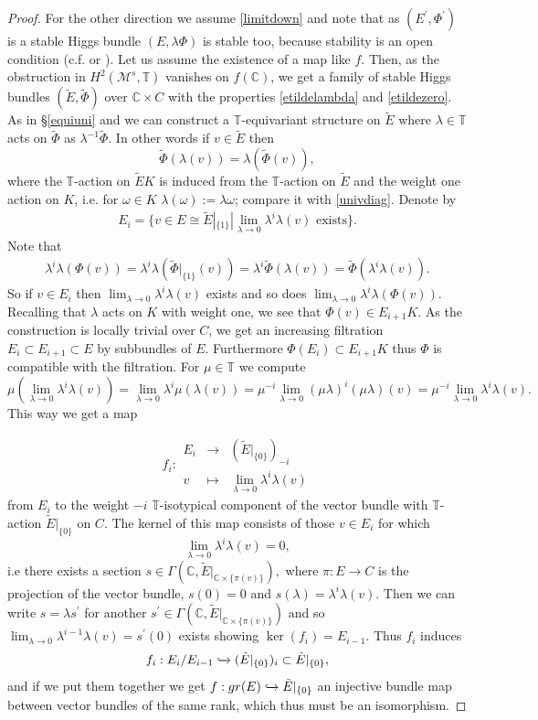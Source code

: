 \documentclass[12pt]{article}
\numberwithin{equation}{section}
\theoremstyle{remark}
\theoremstyle{definition}
\numberwithin{theorem}{section}
\def\beq{\begin{eqnarray}}
\def\eeq{\end{eqnarray}}
\def\C{\mathbb{C}}
\def\M{{\mathcal{M}}}
\newcommand{\T}{{\mathbb{T}}}
\renewcommand{\1}{\mathbbm{1}}
\begin{document}
\begin{proof}
	For the other direction we assume \eqref{limitdown} and note that as $(E^\prime,\Phi^\prime)$ is a stable Higgs bundle $(E,\lambda\Phi)$ is stable too, because stability is an open condition (c.f. \cite[Lemma 3.7]{simpson1} or \cite[Proposition 3.1]{nitsure}). 
	Let us assume the existence of a map like $f$. Then, as the obstruction in $H^2(\M^s,\T)$ vanishes on $f(\C)$, we get a family of stable Higgs bundles $(\tilde{E},\tilde{\Phi})$ over $\C\times C$ with the properties \eqref{etildelambda} and \eqref{etildezero}. As in \S\ref{equiuni} and \cite[\S 4]{hausel-thaddeus} we can construct a $\T$-equivariant structure on $\tilde{E}$ where $\lambda\in \T$ acts on $\tilde{\Phi}$ as $\lambda^{-1}\tilde{\Phi}$. In other words if $v\in \tilde{E}$ then $$\tilde{\Phi}(\lambda(v))=\lambda(\tilde{\Phi}(v)),$$ where the $\T$-action on $\tilde{E}K$ is induced from the $\T$-action on $\tilde{E}$ and the weight  one action on $K$, i.e. for $\omega\in K$ $\lambda(\omega):=\lambda \omega$; compare it with \eqref{univdiag}. Denote by \beq \label{filtdef}E_i=\{v\in E\cong \tilde{E}|_{\{1\}}| \lim_{\lambda\to 0} \lambda^i \lambda(v)  \mbox{ exists} \}.\eeq Note that \beq\label{limphi}\lambda^i\lambda(\Phi(v))=\lambda^i\lambda(\tilde{\Phi}|_{\{1\}}(v))=\lambda^i\tilde{\Phi}(\lambda(v))=\tilde{\Phi}(\lambda^i\lambda(v)).\eeq So if $v\in E_i$ then $\lim_{\lambda\to 0}\lambda^i\lambda(v)$ exists and so does $\lim_{\lambda\to 0}\lambda^i\lambda(\Phi(v))$. Recalling that $\lambda$ acts on $K$ with weight one, we see that $\Phi(v)\in E_{i+1}K$.  As the construction is locally trivial over $C$, we get an increasing filtration $E_i\subset E_{i+1}\subset E$ by subbundles of $E$. Furthermore $\Phi(E_i)\subset E_{i+1}K$ thus $\Phi$ is compatible with the filtration. For $\mu\in \T$ we compute $$\mu(\lim_{\lambda\to 0}\lambda^i\lambda(v)) =\lim_{\lambda\to 0}\lambda^i\mu(\lambda(v))=\mu^{-i}\lim_{\lambda\to 0}(\mu\lambda)^i(\mu\lambda)(v)=\mu^{-i}\lim_{\lambda\to 0}\lambda^i\lambda(v).$$ This way we get a map
	
	 $$f_i:\begin{array}{ccc}E_i&\to &(\tilde{E}|_{\{0\}})_{-i}\\ v &\mapsto& \lim_{\lambda\to 0} \lambda^{i}\lambda(v) \end{array}$$ from $E_i$ to the weight $-i$ $\T$-isotypical component of the vector bundle with $\T$-action $\tilde{E}|_{\{0\}}$ on $C$. The kernel of this map consists of those $v\in E_i$ for which $$ \lim_{\lambda\to 0}\lambda^i\lambda(v)=0,$$ i.e  there exists a section  $s\in \Gamma(\C,\tilde{E}|_{\C\times \{\pi(v)\}}),$ where $\pi:E\to C$ is the projection of the vector bundle,  $s(0)=0$ and $s(\lambda)=\lambda^i\lambda(v)$. Then we can write $s=\lambda s^\prime$ for another $s^\prime\in \Gamma(\C,\tilde{E}|_{\C\times \{\pi(v)\}})$ and so $ \lim_{\lambda\to 0}\lambda^{i-1}\lambda(v)=s^\prime(0)$ exists showing $\ker(f_i)=E_{i-1}$. Thus $f_i$ induces $$f_i:E_i/E_{i-1}\xhookrightarrow{} (\tilde{E}|_{\{0\}})_i\subset \tilde{E}|_{\{0\}}, $$ and if we put them together we get $f:gr(E)\xhookrightarrow{} \tilde{E}|_{\{0\}}$ an injective bundle map between  vector bundles of the same rank, which thus must be an isomorphism. 
	

\end{proof}
\end{document}
